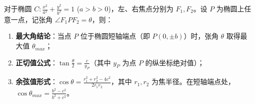 \begin{statementbox}
对于椭圆 $C: \frac{x^2}{a^2} + \frac{y^2}{b^2} = 1$ ($a>b>0$)，左、右焦点分别为 $F_1, F_2$。设 $P$ 为椭圆上任意一点，记张角 $\angle F_1PF_2 = \theta$，则：
\begin{enumerate}
    \item \textbf{最大角结论}：当点 $P$ 位于椭圆短轴端点（即 $P(0, \pm b)$）时，张角 $\theta$ 取得最大值 $\theta_{max}$；
    \item \textbf{正切值公式}：$\tan \frac{\theta}{2} = \frac{c}{y_P}$（其中 $y_P$ 为点 $P$ 的纵坐标绝对值）；
    \item \textbf{余弦值形式}：$\cos \theta = \frac{r_1^2 + r_2^2 - 4c^2}{2r_1r_2}$，其中 $r_1, r_2$ 为焦半径。在短轴端点处，$\cos \theta_{max} = \frac{b^2-c^2}{b^2+c^2}$。
\end{enumerate}
\end{statementbox}
